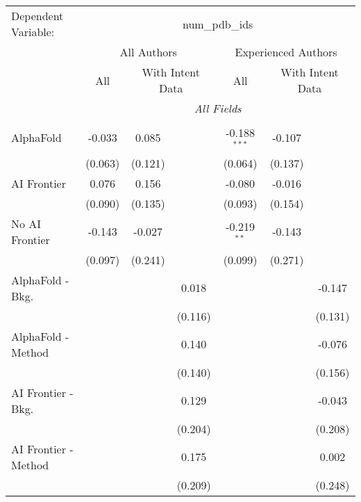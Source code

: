 \begingroup
\centering
\begin{tabular}{lcccccc}
   \tabularnewline \midrule \midrule
   Dependent Variable: & \multicolumn{6}{c}{num\_pdb\_ids}\\
 & \multicolumn{3}{c}{All Authors} & \multicolumn{3}{c}{Experienced Authors} \\
\cmidrule(lr){2-4} \cmidrule(lr){5-7}
 & \multicolumn{1}{c}{All} & \multicolumn{2}{c}{With Intent Data} & \multicolumn{1}{c}{All} & \multicolumn{2}{c}{With Intent Data} \\
\cmidrule(lr){2-2} \cmidrule(lr){3-4} \cmidrule(lr){5-5} \cmidrule(lr){6-7}
 & \multicolumn{6}{c}{\textit{All Fields}} \\ \\
   AlphaFold               & -0.033  & 0.085   &         & -0.188$^{***}$ & -0.107  &   \\   
                           & (0.063) & (0.121) &         & (0.064)        & (0.137) &   \\   
   AI Frontier             & 0.076   & 0.156   &         & -0.080         & -0.016  &   \\   
                           & (0.090) & (0.135) &         & (0.093)        & (0.154) &   \\   
   No AI Frontier          & -0.143  & -0.027  &         & -0.219$^{**}$  & -0.143  &   \\   
                           & (0.097) & (0.241) &         & (0.099)        & (0.271) &   \\   
   AlphaFold - Bkg.        &         &         & 0.018   &                &         & -0.147\\   
                           &         &         & (0.116) &                &         & (0.131)\\   
   AlphaFold - Method      &         &         & 0.140   &                &         & -0.076\\   
                           &         &         & (0.140) &                &         & (0.156)\\   
   AI Frontier - Bkg.      &         &         & 0.129   &                &         & -0.043\\   
                           &         &         & (0.204) &                &         & (0.208)\\   
   AI Frontier - Method    &         &         & 0.175   &                &         & 0.002\\   
                           &         &         & (0.209) &                &         & (0.248)\\   

\end{tabular}
